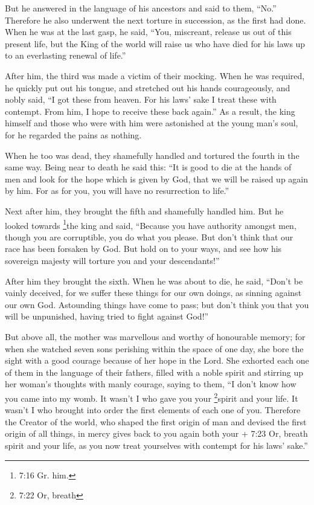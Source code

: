  But he answered in the language of his ancestors and said
to them, ``No.'' Therefore he also underwent the next torture in
succession, as the first had done.  When he was at the last
gasp, he said, ``You, miscreant, release us out of this present life,
but the King of the world will raise us who have died for his laws up to
an everlasting renewal of life.''

 After him, the third was made a victim of their mocking.
When he was required, he quickly put out his tongue, and stretched out
his hands courageously,  and nobly said, ``I got these from
heaven. For his laws' sake I treat these with contempt. From him, I hope
to receive these back again.''  As a result, the king
himself and those who were with him were astonished at the young man's
soul, for he regarded the pains as nothing.

 When he too was dead, they shamefully handled and tortured
the fourth in the same way.  Being near to death he said
this: ``It is good to die at the hands of men and look for the hope
which is given by God, that we will be raised up again by him. For as
for you, you will have no resurrection to life.''

 Next after him, they brought the fifth and shamefully
handled him.  But he looked towards \footnote{7:16 Gr. him.}the
king and said, ``Because you have authority amongst men, though you are
corruptible, you do what you please. But don't think that our race has
been forsaken by God.  But hold on to your ways, and see
how his sovereign majesty will torture you and your descendants!''

 After him they brought the sixth. When he was about to
die, he said, ``Don't be vainly deceived, for we suffer these things for
our own doings, as sinning against our own God. Astounding things have
come to pass;  but don't think you that you will be
unpunished, having tried to fight against God!''

 But above all, the mother was marvellous and worthy of
honourable memory; for when she watched seven sons perishing within the
space of one day, she bore the sight with a good courage because of her
hope in the Lord.  She exhorted each one of them in the
language of their fathers, filled with a noble spirit and stirring up
her woman's thoughts with manly courage, saying to them, 
``I don't know how you came into my womb. It wasn't I who gave you your
\footnote{7:22 Or, breath}spirit and your life. It wasn't I who brought
into order the first elements of each one of you. 
Therefore the Creator of the world, who shaped the first origin of man
and devised the first origin of all things, in mercy gives back to you
again both your + 7:23 Or, breath spirit and your life, as you now treat
yourselves with contempt for his laws' sake.''

